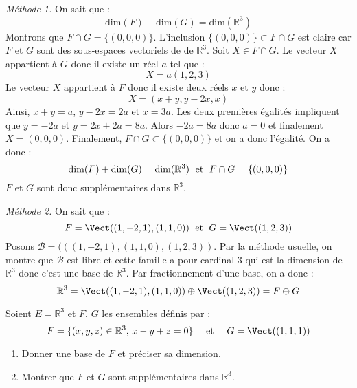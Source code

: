 \documentclass[a4paper,twoside,french,10pt]{VcCours}
\begin{document}
\medskip

\textit{Méthode 1.} On sait que :
$$ \textrm{dim}(F) + \textrm{dim}(G) = \textrm{dim}(\mathbb{R}^3)$$
Montrons que $F \cap G = \lbrace (0,0,0) \rbrace$. L'inclusion $ \lbrace (0,0,0) \rbrace \subset F \cap G$ est claire car $F$ et $G$ sont des sous-espaces vectoriels de de $\mathbb{R}^3$. Soit $X \in F \cap G$. Le vecteur $X$ appartient à $G$ donc il existe un réel $a$ tel que :
$$ X = a(1,2,3)$$
Le vecteur $X$ appartient à $F$ donc il existe deux réels $x$ et $y$ donc :
$$ X = (x+y,y-2x,x)$$
Ainsi, $x+y=a$, $y-2x=2a$ et $x=3a$. Les deux premières égalités impliquent que $y=-2a$ et $y=2x+2a=8a$. Alors $-2a=8a$ donc $a=0$ et finalement $X=(0,0,0)$. Finalement, $F \cap G \subset \lbrace (0,0,0) \rbrace$ et on a donc l'égalité. On a donc :
$$  \textrm{dim}(F) + \textrm{dim}(G) = \textrm{dim}(\mathbb{R}^3) \; \hbox{ et } \; F \cap G = \lbrace (0,0,0) \rbrace$$
$F$ et $G$ sont donc supplémentaires dans $\mathbb{R}^3$.

\medskip

\textit{Méthode 2.} On sait que :
$$ F=\Vect((1,-2,1),(1,1,0)) \; \hbox{ et } \; G=\Vect((1,2,3))$$
Posons $\mathcal{B}=(((1,-2,1),(1,1,0),(1,2,3))$. Par la méthode usuelle, on montre que $\mathcal{B}$ est libre et cette famille a pour cardinal $3$ qui est la dimension de $\mathbb{R}^3$ donc c'est une base de $\mathbb{R}^3$. Par fractionnement d'une base, on a donc :
$$ \mathbb{R}^3 =  \Vect((1,-2,1),(1,1,0)) \oplus \Vect((1,2,3)) = F \oplus G$$


\medskip

\begin{Exercice}{} Soient $E= \mathbb{R}^3$ et $F$, $G$ les ensembles définis par :
$$ F = \lbrace (x,y,z) \in \mathbb{R}^3, \, x-y+z=0 \rbrace \quad \hbox{ et }  \quad G = \Vect((1,1,1)) $$

\begin{enumerate}
\item Donner une base de $F$ et préciser sa dimension.
\item Montrer que $F$ et $G$ sont supplémentaires dans $\mathbb{R}^3$.
\end{enumerate}
\end{Exercice}
\end{document}
